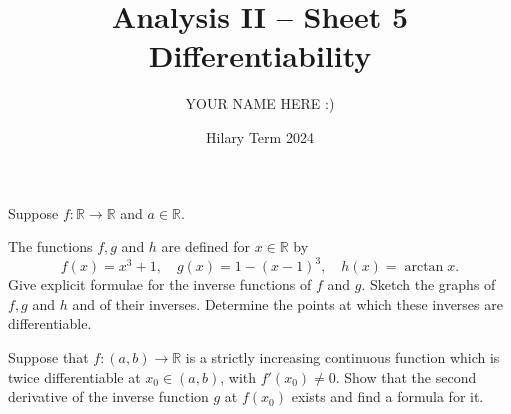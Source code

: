 \documentclass[answers]{exam}
\title{Analysis II -- Sheet 5\\Differentiability}
\author{YOUR NAME HERE :)}
\date{Hilary Term 2024}
\begin{document}
\maketitle
\begin{questions}

\question%



\question%
Suppose $f: \mathbb{R} \to \mathbb{R}$ and $a \in \mathbb{R}$.



\question%
The functions $f, g$ and $h$ are defined for $x \in \mathbb{R}$ by \[
	f(x)=x^{3}+1, \quad g(x)=1-(x-1)^{3}, \quad h(x)=\arctan x.
\] Give explicit formulae for the inverse functions of $f$ and $g$. Sketch the graphs of $f, g$ and $h$ and of their inverses. Determine the points at which these inverses are differentiable.



\question%
Suppose that $f:(a, b) \to \mathbb{R}$ is a strictly increasing continuous function which is twice differentiable at $x_{0} \in(a, b)$, with $f'\left(x_{0}\right) \neq 0$. Show that the second derivative of the inverse function $g$ at $f\left(x_{0}\right)$ exists and find a formula for it.




\end{questions}
\end{document}
